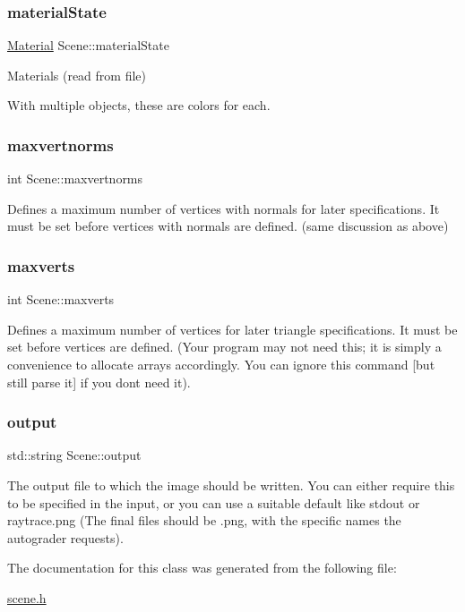\subsubsection{\texorpdfstring{material\+State}{materialState}}
{\footnotesize\ttfamily \mbox{\hyperlink{class_material}{Material}} Scene\+::material\+State}



Materials (read from file) 

With multiple objects, these are colors for each. \mbox{\label{class_scene_ab00585f7f65f5a3c49e4a59432b2083c}} 
\subsubsection{\texorpdfstring{maxvertnorms}{maxvertnorms}}
{\footnotesize\ttfamily int Scene\+::maxvertnorms}

Defines a maximum number of vertices with normals for later specifications. It must be set before vertices with normals are defined. (same discussion as above) \mbox{\label{class_scene_abf5e39ffd2c12b92cb54ce87fb2958cf}} 
\subsubsection{\texorpdfstring{maxverts}{maxverts}}
{\footnotesize\ttfamily int Scene\+::maxverts}

Defines a maximum number of vertices for later triangle specifications. It must be set before vertices are defined. (Your program may not need this; it is simply a convenience to allocate arrays accordingly. You can ignore this command \mbox{[}but still parse it\mbox{]} if you don\textquotesingle{}t need it). \mbox{\label{class_scene_a13a1664c71ce40b237e0a5de3a127357}} 
\subsubsection{\texorpdfstring{output}{output}}
{\footnotesize\ttfamily std\+::string Scene\+::output}

The output file to which the image should be written. You can either require this to be specified in the input, or you can use a suitable default like stdout or raytrace.\+png (The final files should be .png, with the specific names the autograder requests). 

The documentation for this class was generated from the following file\+:\begin{DoxyCompactItemize}
\item 
\mbox{\hyperlink{scene_8h}{scene.\+h}}\end{DoxyCompactItemize}

